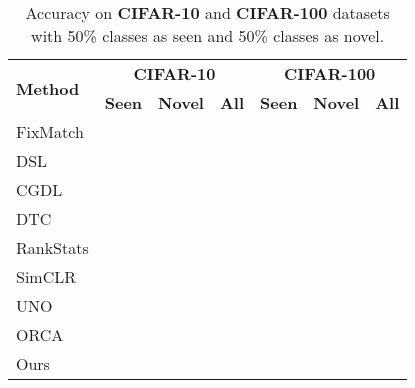 \documentclass[runningheads]{eccv2022submission}
\begin{document}
\begin{table}[h]
\caption{Accuracy on \textbf{CIFAR-10} and \textbf{CIFAR-100} datasets with 50\% classes as seen and 50\% classes as novel.}
\label{tab:cifar10_cifar100}
\begin{center}\setlength{\tabcolsep}{4pt}
\small
\begin{tabular}{lccc|ccc}
\hline



\multicolumn{1}{l}{\multirow{2}{*}{\textbf{Method}}} & \multicolumn{3}{c|}{\textbf{CIFAR-10}} & \multicolumn{3}{c}{\textbf{CIFAR-100}} \\  
\multicolumn{1}{c}{} & \textbf{Seen} & \textbf{Novel} & \textbf{All}  & \textbf{Seen} & \textbf{Novel} & \textbf{All}\\




\hline
FixMatch\cite{sohn2020fixmatch} &  &  &  &  &  & \\
DSL\cite{guo2020safe} &  &  &  &  &  & \\
CGDL\cite{sun2020conditional} &  &  &  &  &  & \\
DTC~\cite{han2019learning} &  &  &  &  &  & \\
RankStats\cite{Han2020Automatically} &  &  &  &  &  & \\
SimCLR\cite{chen2020simple} &  &  &  &  &  & \\
UNO\cite{fini2021unified} &  &  &  &  &  & \\
ORCA\cite{cao2022openworld} &  &  &  &  &  & \\
Ours & {\cellcolor{yellow!15}} & {\cellcolor{yellow!15}} & {\cellcolor{yellow!15}} & {\cellcolor{yellow!15}} & {\cellcolor{yellow!15}} & {\cellcolor{yellow!15}}\\\hline 



\end{tabular}
\end{center}
\vspace{-2mm}
\end{table}
\end{document}
